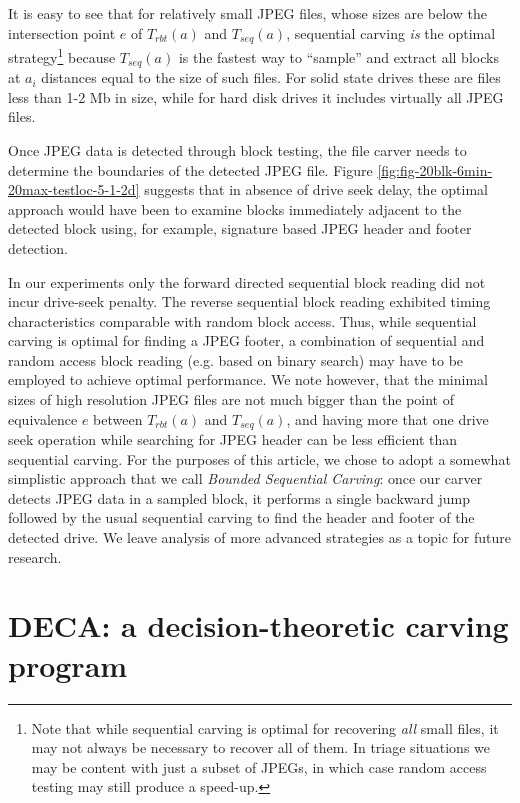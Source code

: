 \documentclass[final,5p,times,twocolumn,authoryear]{elsarticle}
\begin{document}
It is easy to see that for relatively small JPEG files, whose sizes are below the intersection point $e$ of $T_{rbt}(a)$ and $T_{seq}(a)$, sequential carving \emph{is} the optimal strategy\footnote{Note that while sequential carving is optimal for recovering \emph{all} small files, it may not always be necessary to recover all of them. In triage situations we may be content with just a subset of JPEGs, in which case random access testing may still produce a speed-up.} because $T_{seq}(a)$ is the fastest way to ``sample'' and extract all blocks at $a_i$ distances equal to the size of such files. For solid state drives these are files less than 1-2 Mb in size, while for hard disk drives it includes virtually all JPEG files.

Once JPEG data is detected through block testing, the file carver needs to determine the boundaries of the detected JPEG file. Figure \ref{fig:fig-20blk-6min-20max-testloc-5-1-2d} suggests that in absence of drive seek delay, the optimal approach would have been to examine blocks immediately adjacent to the detected block using, for example, signature based JPEG header and footer detection. 

In our experiments only the forward directed sequential block reading did not incur drive-seek penalty. The reverse sequential block reading exhibited timing characteristics comparable with random block access. Thus, while sequential carving is optimal for finding a JPEG footer, a combination of sequential and random access block reading (e.g. based on binary search) may have to be employed to achieve optimal performance. We note however, that the minimal sizes of high resolution JPEG files are not much bigger than the point of equivalence $e$ between $T_{rbt}(a)$ and $T_{seq}(a)$, and having more that one drive seek operation while searching for JPEG header can be less efficient than sequential carving. For the purposes of this article, we chose to adopt a somewhat simplistic approach that we call \emph{Bounded Sequential Carving}: once our carver detects JPEG data in a sampled block, it performs a single backward jump followed by the usual sequential carving to find the header and footer of the detected drive. We leave analysis of more advanced strategies as a topic for future research.

\section{DECA: a decision-theoretic carving program}
\end{document}
